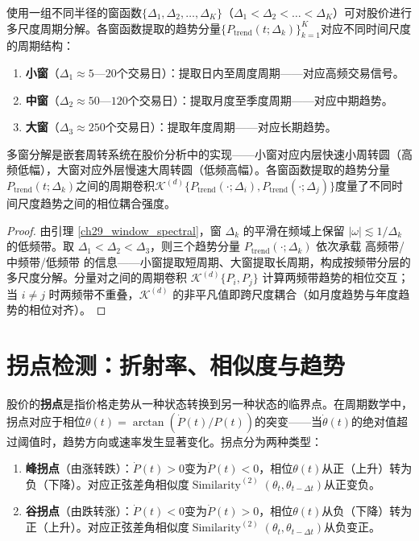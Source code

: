\begin{proposition}[多窗函数叠加的周期分解]\label{prop:multi_window_stock}
使用一组不同半径的窗函数$\{\Delta_1, \Delta_2, \dots, \Delta_K\}$（$\Delta_1 < \Delta_2 < \dots < \Delta_K$）可对股价进行多尺度周期分解。各窗函数提取的趋势分量$\{P_{\text{trend}}(t; \Delta_k)\}_{k=1}^{K}$对应不同时间尺度的周期结构：
\begin{enumerate}[label=(\roman*)]
    \item \textbf{小窗}（$\Delta_1 \approx 5$—$20$个交易日）：提取日内至周度周期——对应高频交易信号。
    \item \textbf{中窗}（$\Delta_2 \approx 50$—$120$个交易日）：提取月度至季度周期——对应中期趋势。
    \item \textbf{大窗}（$\Delta_3 \approx 250$个交易日）：提取年度周期——对应长期趋势。
\end{enumerate}
多窗分解是嵌套周转系统在股价分析中的实现——小窗对应内层快速小周转圆（高频低幅），大窗对应外层慢速大周转圆（低频高幅）。各窗函数提取的趋势分量$P_{\text{trend}}(t; \Delta_k)$之间的周期卷积$\mathcal{K}^{(d)}\{P_{\text{trend}}(\cdot; \Delta_i), P_{\text{trend}}(\cdot; \Delta_j)\}$度量了不同时间尺度趋势之间的相位耦合强度。
\end{proposition}

\begin{proof}
由引理 \ref{ch29_window_spectral}，窗 $\Delta_k$ 的平滑在频域上保留 $|\omega| \lesssim 1/\Delta_k$ 的低频带。取 $\Delta_1 < \Delta_2 < \Delta_3$，则三个趋势分量 $P_{\text{trend}}(\cdot;\Delta_k)$ 依次承载 高频带/中频带/低频带 的信息——小窗提取短周期、大窗提取长周期，构成按频带分层的多尺度分解。分量对之间的周期卷积 $\mathcal{K}^{(d)}\{P_i, P_j\}$ 计算两频带趋势的相位交互；当 $i \neq j$ 时两频带不重叠，$\mathcal{K}^{(d)}$ 的非平凡值即跨尺度耦合（如月度趋势与年度趋势的相位对齐）。
\end{proof}

\section{拐点检测：折射率、相似度与趋势}

\begin{definition}[股价拐点的数学定义]\label{def:stock_inflection_point}
股价的\textbf{拐点}是指价格走势从一种状态转换到另一种状态的临界点。在周期数学中，拐点对应于相位$\theta(t) = \arctan(\dot{P}(t)/P(t))$的突变——当$\dot{\theta}(t)$的绝对值超过阈值时，趋势方向或速率发生显著变化。拐点分为两种类型：
\begin{enumerate}[label=(\roman*)]
    \item \textbf{峰拐点}（由涨转跌）：$\dot{P}(t) > 0$变为$\dot{P}(t) < 0$，相位$\theta(t)$从正（上升）转为负（下降）。对应正弦差角相似度$\operatorname{Similarity}^{(2)}(\theta_t, \theta_{t-\Delta t})$从正变负。
    \item \textbf{谷拐点}（由跌转涨）：$\dot{P}(t) < 0$变为$\dot{P}(t) > 0$，相位$\theta(t)$从负（下降）转为正（上升）。对应正弦差角相似度$\operatorname{Similarity}^{(2)}(\theta_t, \theta_{t-\Delta t})$从负变正。
\end{enumerate}
\end{definition}

